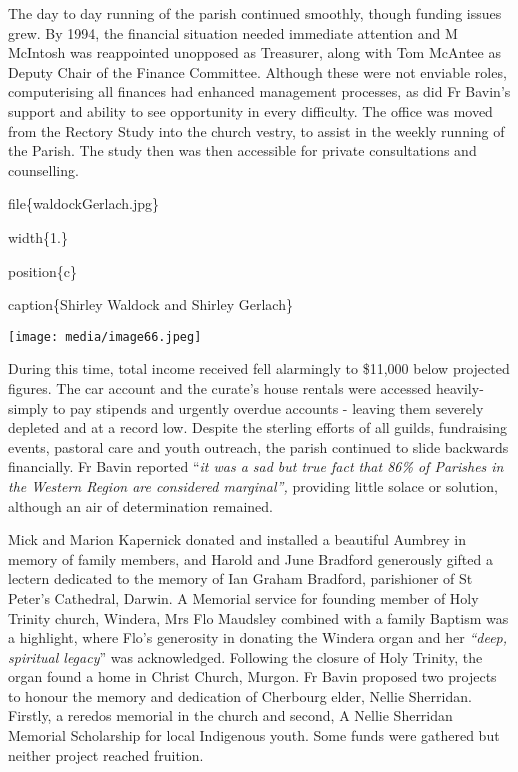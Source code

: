 The day to day running of the parish continued smoothly, though funding issues grew. By 1994, the financial situation needed immediate attention and M McIntosh was reappointed unopposed as Treasurer, along with Tom McAntee as Deputy Chair of the Finance Committee. Although these were not enviable roles, computerising all finances had enhanced management processes, as did Fr Bavin's support and ability to see opportunity in every difficulty. The office was moved from the Rectory Study into the church vestry, to assist in the weekly running of the Parish. The study then was then accessible for private consultations and counselling.

file\{waldockGerlach.jpg\}

width\{1.\}

position\{c\}

caption\{Shirley Waldock and Shirley Gerlach\}

\texttt{[image: media/image66.jpeg]}

During this time, total income received fell alarmingly to \$11,000 below projected figures. The car account and the curate's house rentals were accessed heavily- simply to pay stipends and urgently overdue accounts - leaving them severely depleted and at a record low. Despite the sterling efforts of all guilds, fundraising events, pastoral care and youth outreach, the parish continued to slide backwards financially. Fr Bavin reported ``\emph{it was a sad but true fact that 86\% of Parishes in the Western Region are considered marginal'',} providing little solace or solution, although an air of determination remained.

Mick and Marion Kapernick donated and installed a beautiful Aumbrey in memory of family members, and Harold and June Bradford generously gifted a lectern dedicated to the memory of Ian Graham Bradford, parishioner of St Peter's Cathedral, Darwin. A Memorial service for founding member of Holy Trinity church, Windera, Mrs Flo Maudsley combined with a family Baptism was a highlight, where Flo's generosity in donating the Windera organ and her \emph{``deep, spiritual legacy}'' was acknowledged. Following the closure of Holy Trinity, the organ found a home in Christ Church, Murgon. Fr Bavin proposed two projects to honour the memory and dedication of Cherbourg elder, Nellie Sherridan. Firstly, a reredos memorial in the church and second, A Nellie Sherridan Memorial Scholarship for local Indigenous youth. Some funds were gathered but neither project reached fruition.


